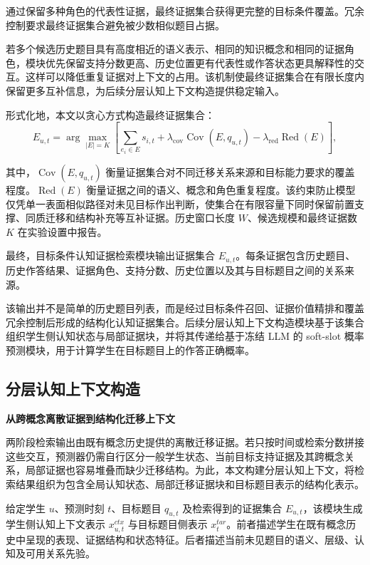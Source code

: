 \documentclass[UTF8,a4paper,12pt]{ctexart}
\numberwithin{table}{section}
\begin{document}
通过保留多种角色的代表性证据，最终证据集合获得更完整的目标条件覆盖。冗余控制要求最终证据集合避免被少数相似题目占据。

若多个候选历史题目具有高度相近的语义表示、相同的知识概念和相同的证据角色，模块优先保留支持分数更高、历史位置更有代表性或作答状态更具解释性的交互。这样可以降低重复证据对上下文的占用。该机制使最终证据集合在有限长度内保留更多互补信息，为后续分层认知上下文构造提供稳定输入。

形式化地，本文以贪心方式构造最终证据集合：
\[
E_{u,t}=\arg\max_{|E|=K}\left[\sum_{e_i\in E}s_{i,t}+\lambda_{\mathrm{cov}}\operatorname{Cov}(E,q_{u,t})-\lambda_{\mathrm{red}}\operatorname{Red}(E)\right],
\]



其中，\(\operatorname{Cov}(E,q_{u,t})\) 衡量证据集合对不同迁移关系来源和目标能力要求的覆盖程度。\(\operatorname{Red}(E)\) 衡量证据之间的语义、概念和角色重复程度。该约束防止模型仅凭单一表面相似路径对未见目标作出判断，使集合在有限容量下同时保留前置支撑、同质迁移和结构补充等互补证据。历史窗口长度 \(W\)、候选规模和最终证据数 \(K\) 在实验设置中报告。

最终，目标条件认知证据检索模块输出证据集合 \(E_{u,t}\)。每条证据包含历史题目、历史作答结果、证据角色、支持分数、历史位置以及其与目标题目之间的关系来源。

该输出并不是简单的历史题目列表，而是经过目标条件召回、证据价值精排和覆盖冗余控制后形成的结构化认知证据集合。后续分层认知上下文构造模块基于该集合组织学生侧认知状态与局部证据块，并将其传递给基于冻结 LLM 的 soft-slot 概率预测模块，用于计算学生在目标题目上的作答正确概率。

\subsection{分层认知上下文构造}

\noindent\textbf{从跨概念离散证据到结构化迁移上下文}



两阶段检索输出由既有概念历史提供的离散迁移证据。若只按时间或检索分数拼接这些交互，预测器仍需自行区分一般学生状态、当前目标支持证据及其跨概念关系，局部证据也容易堆叠而缺少迁移结构。为此，本文构建分层认知上下文，将检索结果组织为包含全局认知状态、局部迁移证据块和目标题目表示的结构化表示。



给定学生 \(u\)、预测时刻 \(t\)、目标题目 \(q_{u,t}\) 及检索得到的证据集合 \(E_{u,t}\)，该模块生成学生侧认知上下文表示 \(x^{ctx}_{u,t}\) 与目标题目侧表示 \(x^{tar}_{t}\)。前者描述学生在既有概念历史中呈现的表现、证据结构和状态特征。后者描述当前未见题目的语义、层级、认知及可用关系先验。
\end{document}
